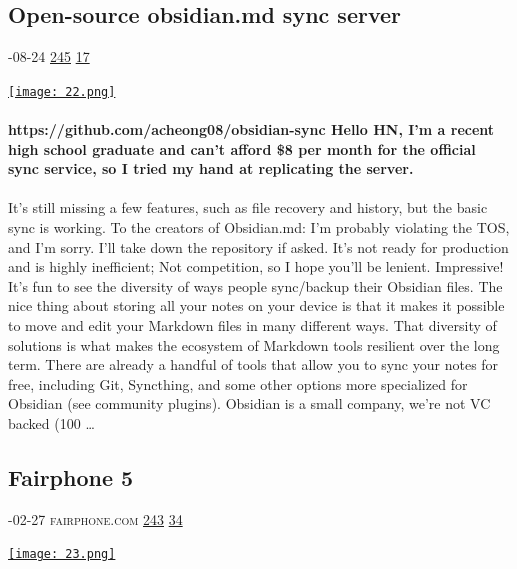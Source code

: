 \documentclass[10pt,a4paper]{article}
\begin{document}
\begin{multicols}{2}
\begin{minipage}{\linewidth}
\subsection{Open-source obsidian.md sync server}
\textsc{\footnotesize
{\scriptsize\faCalendar}-08-24 
{\scriptsize\faThumbsOUp}\space 
\href{}{245} 
{\scriptsize\faComments}\space 
\href{}{17} 
}
\par\medskip\noindent
\href{https://news.ycombinator.com/item?id=37247767\&utm\_source=hackernewsletter\&utm\_medium=email\&utm\_term=show\_hn}{
    \texttt{[image: 22.png]}
}
\end{minipage}
\paragraph{}
\textbf{https://github.com/acheong08/obsidian-sync
Hello HN,
I'm a recent high school graduate and can't afford \$8 per month for the official sync service, so I tried my hand at replicating the server.}
\paragraph{}

It's still missing a few features, such as file recovery and history, but the basic sync is working.
To the creators of Obsidian.md: I'm probably violating the TOS, and I'm sorry. I'll take down the repository if asked. It's not ready for production and is highly inefficient; Not competition, so I hope you'll be lenient.
Impressive! It's fun to see the diversity of ways people sync/backup their Obsidian files. The nice thing about storing all your notes on your device is that it makes it possible to move and edit your Markdown files in many different ways. That diversity of solutions is what makes the ecosystem of Markdown tools resilient over the long term.
There are already a handful of tools that allow you to sync your notes for free, including Git, Syncthing, and some other options more specialized for Obsidian (see community plugins).
Obsidian is a small company, we're not VC backed (100
\dots\par
\noindent\begin{minipage}{\linewidth}
\medskip
\subsection{Fairphone 5}
\textsc{\footnotesize
{\scriptsize\faCalendar}-02-27 
{\scriptsize\faGlobe}\space 
fairphone.com 
{\scriptsize\faThumbsOUp}\space 
\href{http://news.ycombinator.com/item?id=37319626\&utm\_term=comment}{243} 
{\scriptsize\faComments}\space 
\href{http://news.ycombinator.com/item?id=37319626\&utm\_term=comment}{34} 
}
\par\medskip\noindent
\href{https://shop.fairphone.com/fairphone-5?utm\_source=hackernewsletter\&utm\_medium=email\&utm\_term=show\_hn}{
    \texttt{[image: 23.png]}
}
\end{minipage}

\end{multicols}
\end{document}
